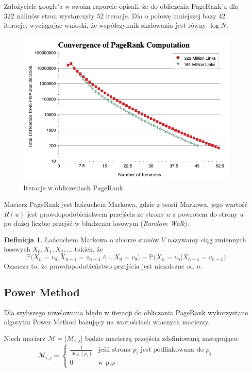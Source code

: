 \documentclass[licencjacka]{pracadypl}
\theoremstyle{definition}
\newtheorem{de}{Definicja}
\begin{document}
Założyciele google'a w swoim raporcie \cite{pagerank-report} opisali, że do obliczenia PageRank'u dla 322 milinów stron wystarczyły 52 iteracje. Dla o połowę mniejszej bazy 42 iteracje, wyciągając wnioski, że współczynnik skalowania jest równy $\log N$.

\begin{figure}[H]
	\centering
	\includegraphics[width=0.6\linewidth]{img/pagerank-iteracja}
	\caption{Iteracje w obliczeniach PageRank}
\end{figure}

Macierz PageRank jest łańcuchem Markowa, gdzie z teorii Markowa, jego wartość $R(u)$ jest prawdopodobieństwem przejścia ze strony $u$ z powrotem do strony $u$ po dużej liczbie przejść w błądzeniu losowym (\textit{Random Walk}).

\begin{de}
	Łańcuchem Markowa o zbiorze stanów $V$ nazywamy ciąg zmiennych losowych $X_0, X_1,X_2, \dots$ takich, że 
	\[
	\mathbb{P} 
	\big(
	X_n = v_n \big| X_{n-1} = v_{n-1} \wedge
	\dots
	X_0 = v_0
	\big) = 
	\mathbb{P} 
	\big(
	X_n = v_n \big| X_{n-1} = v_{n-1}\big)
	\]
	Oznacza to, że prawdopodobieństwo przejścia jest niezależne od $n$.
\end{de}



\subsection{Power Method}

Dla szybszego niwelowania błędu w iteracji do obliczania PageRank wykorzystano algorytm Power Method bazujący na wartościach własnych macierzy.

Niech macierz $\mathcal{M} = \big[ \mathcal{M}_{i,j} \big]_{}$ będzie macierzą przejścia zdefiniowaną następująco:
$$\mathcal{M}_{i,j} = 
\left\{ 
\begin{array}{ll}
	\frac{1}{\deg(p_i) }	 & 	\text{jeśli strona $p_i$ jest podlinkowana do $p_j$}	\\
	0								&	\text{w p.p}
\end{array}
\right.$$
\end{document}
